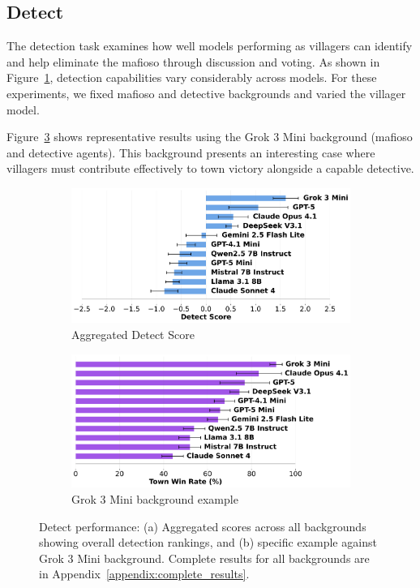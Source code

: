 \documentclass{article}
\begin{document}
\subsection{Detect}

The detection task examines how well models performing as villagers can identify and help eliminate the mafioso through discussion and voting. As shown in Figure~\ref{fig:detect_score}, detection capabilities vary considerably across models. For these experiments, we fixed mafioso and detective backgrounds and varied the villager model.

Figure~\ref{fig:detect_example} shows representative results using the Grok 3 Mini background (mafioso and detective agents). This background presents an interesting case where villagers must contribute effectively to town victory alongside a capable detective.

\begin{figure}[htbp]
    \centering
    \begin{subfigure}[b]{0.48\textwidth}
        \centering
        \includegraphics[width=\textwidth]{../results/villager_score_benchmark.png}
        \caption{Aggregated Detect Score}
        \label{fig:detect_score}
    \end{subfigure}
    \hfill
    \begin{subfigure}[b]{0.48\textwidth}
        \centering
        \includegraphics[width=\textwidth]{../results/villager_grok_3_mini_db_benchmark.png}
        \caption{Grok 3 Mini background example}
        \label{fig:detect_grok_example}
    \end{subfigure}
    \caption{Detect performance: (a) Aggregated scores across all backgrounds showing overall detection rankings, and (b) specific example against Grok 3 Mini background. Complete results for all backgrounds are in Appendix~\ref{appendix:complete_results}.}
    \label{fig:detect_example}
\end{figure}
\end{document}
